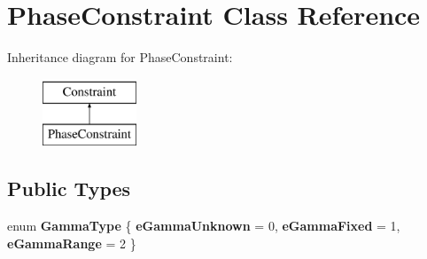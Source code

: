 \hypertarget{class_phase_constraint}{\section{Phase\-Constraint Class Reference}
\label{class_phase_constraint}
}
Inheritance diagram for Phase\-Constraint\-:\begin{figure}[H]
\begin{center}
\leavevmode
\includegraphics[height=2.000000cm]{class_phase_constraint}
\end{center}
\end{figure}
\subsection*{Public Types}
\begin{DoxyCompactItemize}
\item 
enum {\bfseries Gamma\-Type} \{ {\bfseries e\-Gamma\-Unknown} = 0, 
{\bfseries e\-Gamma\-Fixed} = 1, 
{\bfseries e\-Gamma\-Range} = 2
 \}
\end{DoxyCompactItemize}
